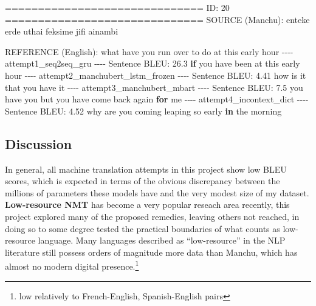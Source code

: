 \documentclass[
  letterpaper,
  DIV=11,
  numbers=noendperiod]{scrartcl}
\newenvironment{Shaded}{\begin{snugshade}}{\end{snugshade}}
\newcommand{\ControlFlowTok}[1]{\textcolor[rgb]{0.00,0.23,0.31}{\textbf{#1}}}
\newcommand{\DecValTok}[1]{\textcolor[rgb]{0.68,0.00,0.00}{#1}}
\newcommand{\ErrorTok}[1]{\textcolor[rgb]{0.68,0.00,0.00}{#1}}
\newcommand{\FloatTok}[1]{\textcolor[rgb]{0.68,0.00,0.00}{#1}}
\newcommand{\FunctionTok}[1]{\textcolor[rgb]{0.28,0.35,0.67}{#1}}
\newcommand{\NormalTok}[1]{\textcolor[rgb]{0.00,0.23,0.31}{#1}}
\newcommand{\SpecialCharTok}[1]{\textcolor[rgb]{0.37,0.37,0.37}{#1}}
\begin{document}
\begin{Shaded}
\begin{Highlighting}[]
\SpecialCharTok{==}\ErrorTok{============================}
\NormalTok{ID}\SpecialCharTok{:} \DecValTok{20}
\SpecialCharTok{==}\ErrorTok{============================}
\FunctionTok{SOURCE}\NormalTok{ (Manchu)}\SpecialCharTok{:}
\NormalTok{enteke erde uthai feksime jifi ainambi}

\FunctionTok{REFERENCE}\NormalTok{ (English)}\SpecialCharTok{:}
\NormalTok{what have you run over to do at this early hour}
\SpecialCharTok{{-}{-}{-}{-}}\NormalTok{ attempt1\_seq2seq\_gru }\SpecialCharTok{{-}{-}{-}{-}}
\NormalTok{Sentence BLEU}\SpecialCharTok{:} \FloatTok{26.3}
\ControlFlowTok{if}\NormalTok{ you have been at this early hour}
\SpecialCharTok{{-}{-}{-}{-}}\NormalTok{ attempt2\_manchubert\_lstm\_frozen }\SpecialCharTok{{-}{-}{-}{-}}
\NormalTok{Sentence BLEU}\SpecialCharTok{:} \FloatTok{4.41}
\NormalTok{how is it that you have it}
\SpecialCharTok{{-}{-}{-}{-}}\NormalTok{ attempt3\_manchubert\_mbart }\SpecialCharTok{{-}{-}{-}{-}}
\NormalTok{Sentence BLEU}\SpecialCharTok{:} \FloatTok{7.5}
\NormalTok{you have you but you have come back again }\ControlFlowTok{for}\NormalTok{ me}
\SpecialCharTok{{-}{-}{-}{-}}\NormalTok{ attempt4\_incontext\_dict }\SpecialCharTok{{-}{-}{-}{-}}
\NormalTok{Sentence BLEU}\SpecialCharTok{:} \FloatTok{4.52}
\NormalTok{why are you coming leaping so early }\ControlFlowTok{in}\NormalTok{ the morning}
\end{Highlighting}
\end{Shaded}

\subsection{Discussion}\label{discussion}

In general, all machine translation attempts in this project show low
BLEU scores, which is expected in terms of the obvious discrepancy
between the millions of parameters these models have and the very modest
size of my dataset. \textbf{Low-resource NMT} has become a very popular
reseach area recently, this project explored many of the proposed
remedies, leaving others not reached, in doing so to some degree tested
the practical boundaries of what counts as low-resource language. Many
languages described as ``low-resource'' in the NLP literature still
possess orders of magnitude more data than Manchu, which has almost no
modern digital presence.\footnote{low relatively to French-English,
  Spanish-English pairs}
\end{document}
